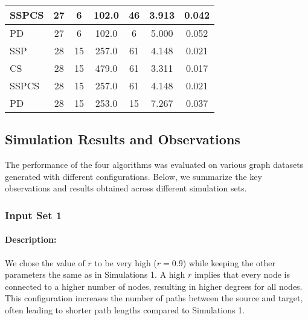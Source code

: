 \documentclass{article}
\begin{document}
\begin{table}[H]
{\begin{tabular}{|l|c|c|c|c|c|c|}
SSPCS              & 27             & 6                 & 102.0                  & 46             & 3.913                     & 0.042                                   \\ \hline
PD                 & 27             & 6                 & 102.0                  & 6              & 5.000                     & 0.052                                   \\ \hline
\hhline{|=======|}
SSP                & 28             & 15                & 257.0                  & 61             & 4.148                     & 0.021                                   \\ \hline
CS                 & 28             & 15                & 479.0                  & 61             & 3.311                     & 0.017                                   \\ \hline
SSPCS              & 28             & 15                & 257.0                  & 61             & 4.148                     & 0.021                                   \\ \hline
PD                 & 28             & 15                & 253.0                  & 15             & 7.267                     & 0.037                                   \\ \hline
\end{tabular}%
}
\label{tab:simulation2_set5_algorithm_metrics}
\end{table}

\subsection{Simulation Results and Observations}

The performance of the four algorithms was evaluated on various graph datasets generated with different configurations. Below, we summarize the key observations and results obtained across different simulation sets.

\subsubsection{Input Set 1}
\paragraph{Description:}
We chose the value of \( r \) to be very high (\( r = 0.9 \)) while keeping the other parameters the same as in Simulations 1. A high \( r \) implies that every node is connected to a higher number of nodes, resulting in higher degrees for all nodes. This configuration increases the number of paths between the source and target, often leading to shorter path lengths compared to Simulations 1.
\end{document}
